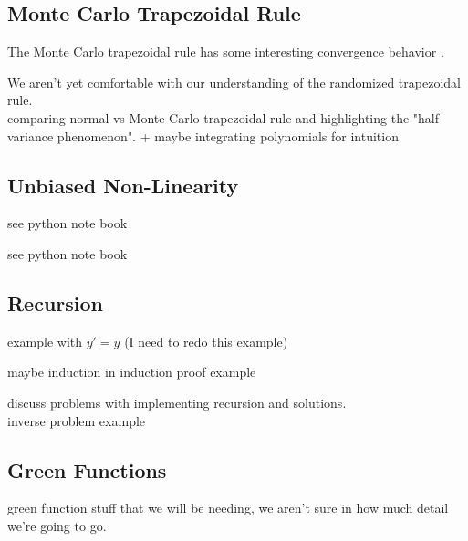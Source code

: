 \documentclass[a4paper,12pt]{article}
\begin{document}
\begin{comment}
Introduces Russian roulette, splitting, control variates, importance sampling and maybe quasi Monte Carlo with the
$y'=y$ example. We are missing importance sampling and quasi MC
\end{comment}


\subsection{Monte Carlo Trapezoidal Rule}
The Monte Carlo trapezoidal rule has some interesting convergence
behavior \cite{wu_randomised_2020}.

We aren't yet comfortable with our understanding of the randomized trapezoidal rule. \\
comparing normal vs Monte Carlo trapezoidal rule and highlighting the "half variance phenomenon".
+ maybe integrating polynomials for intuition

\subsection{Unbiased Non-Linearity}
\begin{example}[$y'=y^{2}$]
    see python note book
\end{example}

\begin{example}[$e^{E[X]}$]
    see python note book
\end{example}

\subsection{Recursion}

\begin{example}
    example with $y'=y$ (I need to redo this example)
\end{example}

\begin{example}
    maybe induction in induction proof example
\end{example}

\begin{example}
    discuss problems with implementing recursion and solutions.  \\
    inverse problem example
\end{example}

\subsection{Green Functions}
green function stuff that we will be needing, we aren't sure in how much detail we're going to go.
\end{document}
